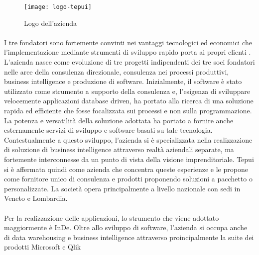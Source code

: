 \begin{figure}[!h] 
	\centering 
	\texttt{[image: logo-tepui]} 
	\caption{Logo dell'azienda}
\end{figure}

 
\paragraph*{}I tre fondatori sono fortemente convinti nei vantaggi tecnologici ed economici che l'implementazione mediante strumenti di sviluppo rapido porta ai propri clienti \hyperref[bib1]{\cite{[1]}}. 
L'azienda nasce come evoluzione di tre progetti indipendenti dei tre soci fondatori nelle aree della consulenza direzionale, consulenza nei processi produttivi, business intelligence  e produzione di software. 
Inizialmente, il software è stato utilizzato come strumento a supporto della consulenza e, l'esigenza di sviluppare velocemente applicazioni database driven, ha portato alla ricerca di una soluzione rapida ed efficiente che fosse focalizzata sui processi e non sulla programmazione. 
La potenza e versatilità della soluzione adottata ha portato a fornire anche esternamente servizi di sviluppo e software basati su tale tecnologia. 
Contestualmente a questo sviluppo, l'azienda si è specializzata nella realizzazione di soluzione di business intelligence attraverso realtà aziendali separate, ma fortemente interconnesse da un punto di vista della visione imprenditoriale.
Tepui si è affermata quindi come azienda che concentra queste esperienze e le propone come fornitore unico di consulenza e prodotti proponendo soluzioni a pacchetto o personalizzate. 
La società opera principalmente a livello nazionale con sedi in Veneto e Lombardia.

\paragraph*{}Per la realizzazione delle applicazioni, lo strumento che viene adottato maggiormente è InDe. Oltre allo sviluppo di software, l’azienda si occupa anche di data warehousing e business intelligence attraverso proincipalmente la suite dei prodotti Microsoft e Qlik 



